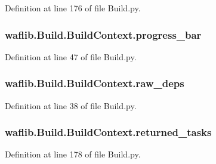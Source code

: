Definition at line 176 of file Build.\+py.

\subsubsection[{\texorpdfstring{progress\+\_\+bar}{progress_bar}}]{\setlength{\rightskip}{0pt plus 5cm}waflib.\+Build.\+Build\+Context.\+progress\+\_\+bar}\hypertarget{classwaflib_1_1_build_1_1_build_context_a8a70e390de4e255257df4d73df770fc9}{}\label{classwaflib_1_1_build_1_1_build_context_a8a70e390de4e255257df4d73df770fc9}


Definition at line 47 of file Build.\+py.

\subsubsection[{\texorpdfstring{raw\+\_\+deps}{raw_deps}}]{\setlength{\rightskip}{0pt plus 5cm}waflib.\+Build.\+Build\+Context.\+raw\+\_\+deps}\hypertarget{classwaflib_1_1_build_1_1_build_context_a1aa6c8d3de4821202677432adbfe87d7}{}\label{classwaflib_1_1_build_1_1_build_context_a1aa6c8d3de4821202677432adbfe87d7}


Definition at line 38 of file Build.\+py.

\subsubsection[{\texorpdfstring{returned\+\_\+tasks}{returned_tasks}}]{\setlength{\rightskip}{0pt plus 5cm}waflib.\+Build.\+Build\+Context.\+returned\+\_\+tasks}\hypertarget{classwaflib_1_1_build_1_1_build_context_a29bc45beb07367aeda1454961fbf9e50}{}\label{classwaflib_1_1_build_1_1_build_context_a29bc45beb07367aeda1454961fbf9e50}


Definition at line 178 of file Build.\+py.


